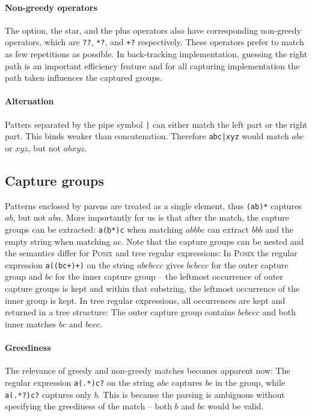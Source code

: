 \documentclass[11pt,a4paper,twoside,openright]{Thesis}
\theoremstyle{definition}
\begin{document}
\paragraph{Non-greedy operators} The option, the star, and the plus operators
also have corresponding non-greedy operators, which are \texttt{??},
\texttt{*?}, and \texttt{+?} respectively. These operators prefer to match as
few repetitions as possible. In back-tracking implementation, guessing the
right path is an important efficiency feature and for all capturing
implementation the path taken influences the captured groups.

\paragraph{Alternation} Patters separated by the pipe symbol \texttt{|} can
either match the left part or the right part. This binds weaker than
concatenation. Therefore \texttt{abc|xyz} would match $abc$ or $xyz$, but not
$abxyz$.

\subsection{Capture groups}
Patterns enclosed by parens are treated as a single element, thus
\texttt{(ab)*} captures $ab$, but not $aba$. More importantly for us is that
after the match, the capture groups can be extracted: \texttt{a(b*)c} when
matching $abbbc$ can extract $bbb$ and the empty string when matching $ac$.
Note that the capture groups can be nested and the semantics differ for
\textsc{Posix} and tree regular expressions: In \textsc{Posix} the regular expression
\texttt{a((bc+)+)} on the string $abcbccc$ gives $bcbccc$ for the outer
capture group and $bc$ for the inner capture group -- the leftmost occurrence of
outer capture groups is kept and within that substring, the leftmost occurrence
of the inner group is kept. In tree regular expressions, all occurrences are kept and returned
in a tree structure: The outer capture group contains $bcbccc$ and both inner
matches $bc$ and $bccc$.

\paragraph{Greediness}
The relevance of greedy and non-greedy matches becomes apparent now: The
regular expression \texttt{a(.*)c?} on the string $abc$ captures $bc$ in
the group, while \texttt{a(.*?)c?} captures only $b$. This is because
the parsing is ambiguous without specifying the greediness of the match -- both
$b$ and $bc$ would be valid.
\end{document}

